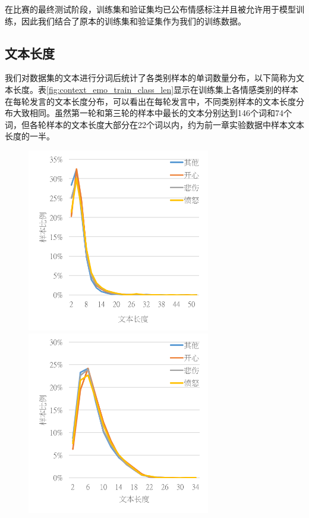 在比赛的最终测试阶段，训练集和验证集均已公布情感标注并且被允许用于模型训练，因此我们结合了原本的训练集和验证集作为我们的训练数据。

\subsection{文本长度}

我们对数据集的文本进行分词后统计了各类别样本的单词数量分布，以下简称为文本长度。表\ref{fig:context_emo_train_class_len}显示在训练集上各情感类别的样本在每轮发言的文本长度分布，可以看出在每轮发言中，不同类别样本的文本长度分布大致相同。虽然第一轮和第三轮的样本中最长的文本分别达到146个词和74个词，但各轮样本的文本长度大部分在22个词以内，约为前一章实验数据中样本文本长度的一半。

\begin{figure}[h]
  \centering%

  \begin{minipage}{\linewidth}

    {\includegraphics[height=8cm]{img/semeval2019_task3_train_0_class_len.png}}%
      {\includegraphics[height=8cm]{img/semeval2019_task3_train_1_class_len.png}}


\end{minipage}
\end{figure}

